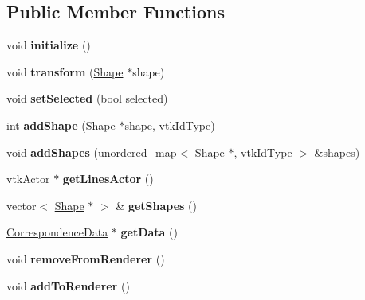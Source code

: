 \subsection*{Public Member Functions}
\begin{DoxyCompactItemize}
\item 
\hypertarget{class_correspondence_a34ed80f7b9f122870e23908e08f1835f}{}void {\bfseries initialize} ()\label{class_correspondence_a34ed80f7b9f122870e23908e08f1835f}

\item 
\hypertarget{class_correspondence_aa40bb5eabdbf80573a7410bc0cf81049}{}void {\bfseries transform} (\hyperlink{class_shape}{Shape} $\ast$shape)\label{class_correspondence_aa40bb5eabdbf80573a7410bc0cf81049}

\item 
\hypertarget{class_correspondence_a7322dead4fbf4f20629c3f6c86767b99}{}void {\bfseries set\+Selected} (bool selected)\label{class_correspondence_a7322dead4fbf4f20629c3f6c86767b99}

\item 
\hypertarget{class_correspondence_a79a827237baa9ffb2bce6721177bb86c}{}int {\bfseries add\+Shape} (\hyperlink{class_shape}{Shape} $\ast$shape, vtk\+Id\+Type)\label{class_correspondence_a79a827237baa9ffb2bce6721177bb86c}

\item 
\hypertarget{class_correspondence_a180d776bd5b68d9fe79ca0b5b15dcd53}{}void {\bfseries add\+Shapes} (unordered\+\_\+map$<$ \hyperlink{class_shape}{Shape} $\ast$, vtk\+Id\+Type $>$ \&shapes)\label{class_correspondence_a180d776bd5b68d9fe79ca0b5b15dcd53}

\item 
\hypertarget{class_correspondence_ad921b2eb4bb93b90bcf1f328dfbcb5cd}{}vtk\+Actor $\ast$ {\bfseries get\+Lines\+Actor} ()\label{class_correspondence_ad921b2eb4bb93b90bcf1f328dfbcb5cd}

\item 
\hypertarget{class_correspondence_a35cc321139f0016900b27b16bf405eab}{}vector$<$ \hyperlink{class_shape}{Shape} $\ast$ $>$ \& {\bfseries get\+Shapes} ()\label{class_correspondence_a35cc321139f0016900b27b16bf405eab}

\item 
\hypertarget{class_correspondence_ad0a90dc928e29ea7bb335c3a39702439}{}\hyperlink{class_correspondence_data}{Correspondence\+Data} $\ast$ {\bfseries get\+Data} ()\label{class_correspondence_ad0a90dc928e29ea7bb335c3a39702439}

\item 
\hypertarget{class_correspondence_ae17d48fc05a5fb4a8c0e9a0d61830e48}{}void {\bfseries remove\+From\+Renderer} ()\label{class_correspondence_ae17d48fc05a5fb4a8c0e9a0d61830e48}

\item 
\hypertarget{class_correspondence_ae31e3f7d5891d44c28ac04c3bfd5b789}{}void {\bfseries add\+To\+Renderer} ()\label{class_correspondence_ae31e3f7d5891d44c28ac04c3bfd5b789}

\end{DoxyCompactItemize}
